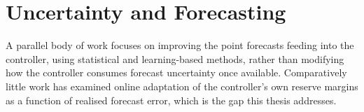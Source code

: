 \section{Uncertainty and Forecasting}

A parallel body of work focuses on improving the point forecasts feeding into the controller, using statistical and learning-based methods, rather than modifying how the controller consumes forecast uncertainty once available. Comparatively little work has examined online adaptation of the controller's own reserve margins as a function of realised forecast error, which is the gap this thesis addresses.
